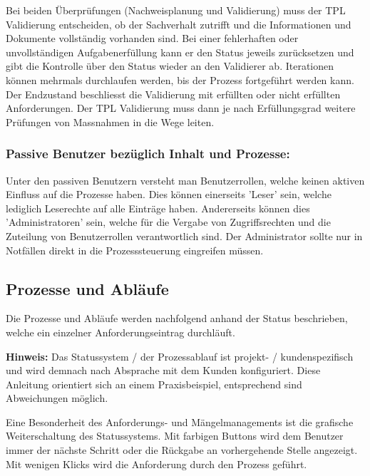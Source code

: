 Bei beiden Überprüfungen (Nachweisplanung und Validierung) muss der TPL Validierung entscheiden, ob der Sachverhalt zutrifft und die Informationen und Dokumente vollständig vorhanden sind. Bei einer fehlerhaften oder unvollständigen Aufgabenerfüllung kann er den Status jeweils zurücksetzen und gibt die Kontrolle über den Status wieder an den Validierer ab. Iterationen können mehrmals durchlaufen werden, bis der Prozess fortgeführt werden kann. \\

Der Endzustand beschliesst die Validierung mit erfüllten oder nicht erfüllten Anforderungen. Der TPL Validierung muss dann je nach Erfüllungsgrad weitere Prüfungen von Massnahmen in die Wege leiten.

\subsubsection{Passive Benutzer bezüglich Inhalt und Prozesse:} 

Unter den passiven Benutzern versteht man Benutzerrollen, welche keinen aktiven Einfluss auf die Prozesse haben. Dies können einerseits 'Leser' sein, welche lediglich Leserechte auf alle Einträge haben. Andererseits können dies 'Administratoren' sein, welche für die Vergabe von Zugriffsrechten und die Zuteilung von Benutzerrollen verantwortlich sind. Der Administrator sollte nur in Notfällen direkt in die Prozesssteuerung eingreifen müssen.

\subsection{Prozesse und Abläufe}

Die Prozesse und Abläufe werden nachfolgend anhand der Status beschrieben, welche ein einzelner Anforderungseintrag durchläuft. 

\vspace{\baselineskip}

\textbf{Hinweis:} Das Statussystem / der Prozessablauf ist projekt- / kundenspezifisch und wird demnach nach Absprache mit dem Kunden konfiguriert. Diese Anleitung orientiert sich an einem Praxisbeispiel, entsprechend sind Abweichungen möglich.

\vspace{\baselineskip}

Eine Besonderheit des Anforderungs- und Mängelmanagements ist die grafische Weiterschaltung des Statussystems. Mit farbigen Buttons wird dem Benutzer immer der nächste Schritt oder die Rückgabe an vorhergehende Stelle angezeigt. Mit wenigen Klicks wird die Anforderung durch den Prozess geführt.

